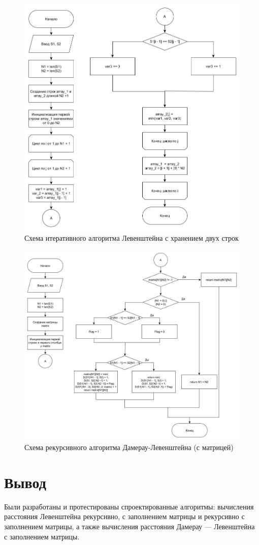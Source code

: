 \begin{figure}[hp]
    \begin{center}
        \includegraphics[width=\linewidth]{graph/LevenMatr.jpg}
    \end{center}
    \caption{Схема итеративного алгоритма Левенштейна с хранением двух строк}
\end{figure}
\begin{figure}[hp]
    \begin{center}
        \includegraphics[width=\linewidth]{graph/Damerau.jpg}
    \end{center}
    \caption{Схема рекурсивного алгоритма Дамерау-Левенштейна (с матрицей)}
\end{figure}


\clearpage

\section{Вывод}
Были разработаны и протестированы спроектированные алгоритмы: вычисления расстояния Левенштейна рекурсивно, с заполнением матрицы и рекурсивно с заполнением матрицы, а также вычисления расстояния Дамерау — Левенштейна с заполнением матрицы.
